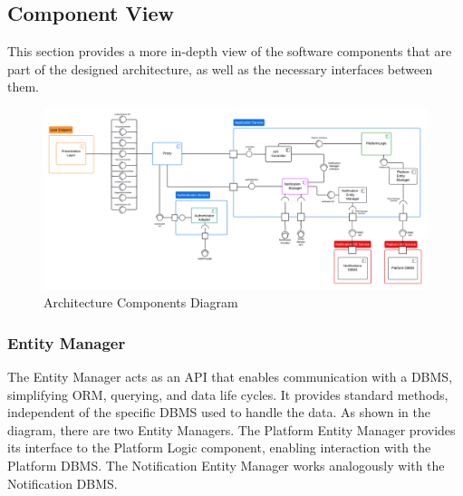 \subsection{Component View}
This section provides a more in-depth view of the software components that are part of the designed architecture, as well as the necessary interfaces between them.
\begin{figure}[H]
    \centering
    \includegraphics[width=\linewidth]{Latex/Images/DD/Component0.png}
    \caption{Architecture Components Diagram}
    \label{fig:Components}
\end{figure}
\subsubsection{Entity Manager}
The Entity Manager acts as an API that enables communication with a DBMS, simplifying ORM, querying, and data life cycles. It provides standard methods, independent of the specific DBMS used to handle the data. As shown in the diagram, there are two Entity Managers. The Platform Entity Manager provides its interface to the Platform Logic component, enabling interaction with the Platform DBMS. The Notification Entity Manager works analogously with the Notification DBMS.

